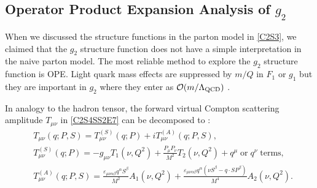 \subsection{\texorpdfstring{Operator Product Expansion Analysis of $g_2$}{Operator Product Expansion Analysis of g2}}
\label{C3S2SS1}

When we discussed the structure functions in the parton model in \cref{C2S3}, we claimed that the $g_2$ structure function does not have a simple interpretation in the naive parton model. The most reliable method to explore the $g_2$ structure function is OPE. Light quark mass effects are suppressed by $m/Q$ in $F_1$ or $g_1$ but they are important in $g_2$ where they enter as $\order{m/\Lambda_{\mathrm{QCD}}}$ \cite{Jaffe1991}.

In analogy to the hadron tensor, the forward virtual Compton scattering amplitude $T_{\mu\nu}$ in \cref{C2S4SS2E7} can be decomposed to \cite{Jaffe1990}:
\begin{align} \label{C3S2SS1E1}
& T_{\mu\nu}(q;P,S) = T_{\mu\nu}^{(S)}(q;P) + iT_{\mu\nu}^{(A)}(q;P,S), \\ \label{C3S2SS1E2}
& T_{\mu\nu}^{(S)}(q;P) = -g_{\mu\nu}T_1(\nu,Q^2)+\frac{P_\mu P_\nu}{M^2}T_2(\nu,Q^2)+q^\mu\;\mathrm{or}\; q^\nu\;\mathrm{terms}, \\ \label{C3S2SS1E3}
& T_{\mu\nu}^{(A)}(q;P,S) = \frac{\varepsilon_{\mu\nu\alpha\beta}q^\alpha S^\beta}{M^2}A_1(\nu,Q^2)+\frac{\varepsilon_{\mu\nu\alpha\beta}q^\alpha(\nu S^\beta-q\cdot SP^\beta)}{M^4}A_2(\nu,Q^2).
\end{align}


